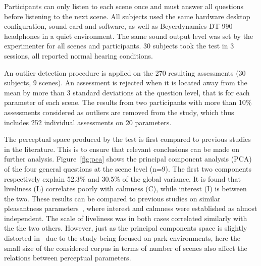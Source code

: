 \documentclass{article}
\begin{document}
\begin{sloppy}
Participants can only listen to each scene once and must answer all questions before listening to the next scene. All subjects used the same hardware desktop configuration, sound card and software, as well as Beyerdynamics DT-990 headphones in a quiet environment. The same sound output level was set by the experimenter for all scenes and participants. 30 subjects took the test in 3 sessions, all reported normal hearing conditions.

An outlier detection procedure is applied on the 270 resulting assessments (30 subjects, 9 scenes). An assessment is rejected when it is located away from the mean by more than 3 standard deviations at the question level, that is for each parameter of each scene. The results from two participants with more than 10\% assessments considered as outliers are removed from the study, which thus includes 252 individual assessments on 20 parameters.

The perceptual space produced by the test is first compared to previous studies in the literature. This is to ensure that relevant conclusions can be made on further analysis. Figure~\ref{fig:pca} shows the principal component analysis (PCA) of the four general questions at the scene level (n=9). The first two components respectively explain 52.3\% and 30.5\% of the global variance. It is found that liveliness (L) correlates poorly with calmness (C), while interest (I) is between the two. These results can be compared to previous studies on similar pleasantness parameters~\cite{axelsson2010, cain2013, jeon2018}, where interest and calmness were established as almost independent. The scale of liveliness was in both cases correlated similarly with the the two others. However, just as the principal components space is slightly distorted in~\cite{jeon2018} due to the study being focused on park environments, here the small size of the considered corpus in terms of number of scenes also affect the relations between perceptual parameters.


\end{sloppy}
\end{document}
